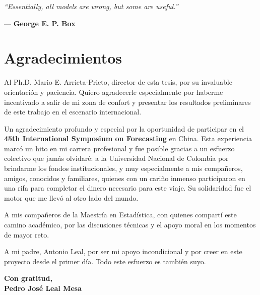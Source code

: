 \documentclass[12pt,spanish,openany,letterpaper,pagesize]{scrbook}
\begin{document}
\vspace{4cm}

\begin{flushright}
\begin{minipage}{8cm}
    \small\itshape
    ``Essentially, all models are wrong, but some are useful.''
    
    \medskip
    \normalfont --- \textbf{George E. P. Box}
\end{minipage}
\end{flushright}


\chapter*{Agradecimientos}

Al Ph.D. Mario E. Arrieta-Prieto, director de esta tesis, por su invaluable orientación y paciencia. Quiero agradecerle especialmente por haberme incentivado a salir de mi zona de confort y presentar los resultados preliminares de este trabajo en el escenario internacional.

\bigskip

Un agradecimiento profundo y especial por la oportunidad de participar en el \textbf{45th International Symposium on Forecasting} en China. Esta experiencia marcó un hito en mi carrera profesional y fue posible gracias a un esfuerzo colectivo que jamás olvidaré: a la Universidad Nacional de Colombia por brindarme los fondos institucionales, y muy especialmente a mis compañeros, amigos, conocidos y familiares, quienes con un cariño inmenso participaron en una rifa para completar el dinero necesario para este viaje. Su solidaridad fue el motor que me llevó al otro lado del mundo.

\bigskip

A mis compañeros de la Maestría en Estadística, con quienes compartí este camino académico, por las discusiones técnicas y el apoyo moral en los momentos de mayor reto.

\bigskip

A mi padre, Antonio Leal, por ser mi apoyo incondicional y por creer en este proyecto desde el primer día. Todo este esfuerzo es también suyo.

\bigskip

\begin{flushright}
\textbf{Con gratitud,\\Pedro José Leal Mesa}
\end{flushright}
\end{document}
